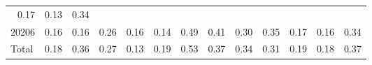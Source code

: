 \begin{table}[!h]
\begin{tabular}{lllllllllllll}
  \multicolumn{1}{r}{0.17} &
  \multicolumn{1}{r}{0.13} &
  \multicolumn{1}{r}{0.34} \\
\multicolumn{1}{l}{\hspace{1em}20206} &
  \multicolumn{1}{|r}{0.16} &
  \multicolumn{1}{r}{0.16} &
  \multicolumn{1}{r}{0.26} &
  \multicolumn{1}{r}{0.16} &
  \multicolumn{1}{r}{0.14} &
  \multicolumn{1}{r}{0.49} &
  \multicolumn{1}{r}{0.41} &
  \multicolumn{1}{r}{0.30} &
  \multicolumn{1}{r}{0.35} &
  \multicolumn{1}{r}{0.17} &
  \multicolumn{1}{r}{0.16} &
  \multicolumn{1}{r}{0.34} \\
\multicolumn{1}{l}{\hspace{1em}Total} &
  \multicolumn{1}{|r}{0.18} &
  \multicolumn{1}{r}{0.36} &
  \multicolumn{1}{r}{0.27} &
  \multicolumn{1}{r}{0.13} &
  \multicolumn{1}{r}{0.19} &
  \multicolumn{1}{r}{0.53} &
  \multicolumn{1}{r}{0.37} &
  \multicolumn{1}{r}{0.34} &
  \multicolumn{1}{r}{0.31} &
  \multicolumn{1}{r}{0.19} &
  \multicolumn{1}{r}{0.18} &
  \multicolumn{1}{r}{0.37} \\
\cline{1-13}
\end{tabular}
\end{table}
